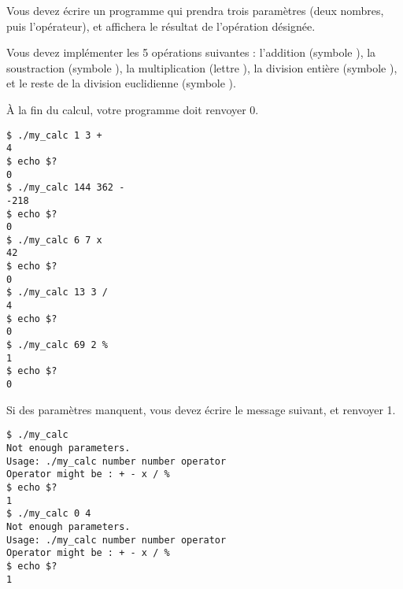 

\vspace*{0.7cm}

\noindent {}

\bigskip

\noindent Vous devez écrire un programme qui prendra trois paramètres (deux nombres, puis l'opérateur), et affichera le résultat de l'opération désignée.

\noindent Vous devez implémenter les 5 opérations suivantes : l'addition (symbole \TTBF{+}), la soustraction (symbole \TTBF{-}), la multiplication (lettre ), la division entière (symbole \TTBF{/}), et le reste de la division euclidienne (symbole \TTBF{\%}).

\noindent \`A la fin du calcul, votre programme doit renvoyer 0.

\bigskip

\lstset{language=sh}
\begin{lstlisting}[frame=single,title={Cas général}]
$ ./my_calc 1 3 +
4
$ echo $?
0
$ ./my_calc 144 362 -
-218
$ echo $?
0
$ ./my_calc 6 7 x
42
$ echo $?
0
$ ./my_calc 13 3 /
4
$ echo $?
0
$ ./my_calc 69 2 %
1
$ echo $?
0
\end{lstlisting}

\bigskip

\noindent Si des paramètres manquent, vous devez écrire le message suivant, et renvoyer 1.

\bigskip

\noindent {}

\noindent {}

\noindent {}

\bigskip

\lstset{language=sh}
\begin{lstlisting}[frame=single,title={Cas d'erreur 1 : pas assez de paramètres}]
$ ./my_calc
Not enough parameters.
Usage: ./my_calc number number operator
Operator might be : + - x / %
$ echo $?
1
$ ./my_calc 0 4
Not enough parameters.
Usage: ./my_calc number number operator
Operator might be : + - x / %
$ echo $?
1
\end{lstlisting}

